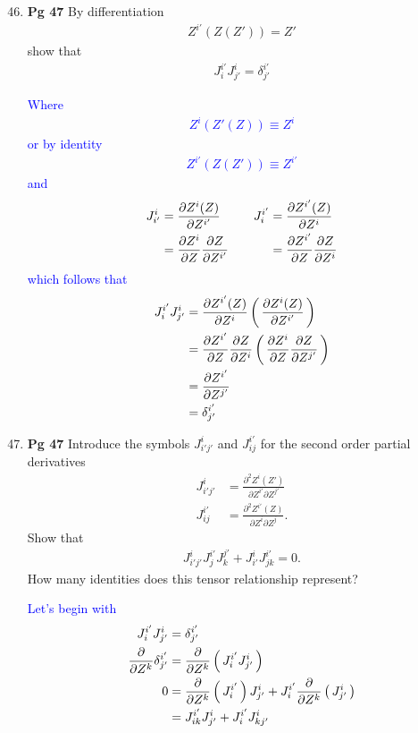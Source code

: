 \documentclass[12pt,a4paper]{report}
\newcommand{\BLUE}[1]{\textcolor{blue}{#1}}
\begin{document}
\begin{enumerate}[label=\textbf{4.\arabic*}]

\setcounter{enumi}{45}
	\item \textbf{Pg 47}  By differentiation
	\begin{align*}
		Z^{i'}(Z(Z'))=Z'
	\end{align*}show that 
	\begin{align*}
		J_i^{i'}J_{j'}^i= \delta^{i'}_{j'}
	\end{align*}
	
	\BLUE{Where
	\begin{align*}
		Z^i(Z'(Z)) \equiv Z^i
	\end{align*}or by identity
	\begin{align*}
		Z^{i'}(Z(Z')) \equiv Z^{i'}
	\end{align*}and
	\begin{align*}
		J_{i'}^i &= \frac{\partial Z^i(Z)}{\partial Z^{i'}} & \quad
		J_i^{i'} &= \frac{\partial Z^{i'}(Z)}{\partial Z^i} \\
			&= \frac{\partial Z^i}{\partial Z}\frac{\partial Z}{\partial Z^{i'}} & \quad &= \frac{\partial Z^{i'}}{\partial Z}\frac{\partial Z}{\partial Z^i}
	\end{align*}which follows that
	\begin{align*}
		J_i^{i'}J_{j'}^i &= \frac{\partial Z^{i'}(Z)}{\partial Z^i}\left (\, \frac{\partial Z^i(Z)}{\partial Z^{i'}} \,\right ) \\
		&= \frac{\partial Z^{i'}}{\partial Z}\frac{\partial Z}{\partial Z^i}\left (\, \frac{\partial Z^i}{\partial Z}\frac{\partial Z}{\partial Z^{j'}} \,\right ) \\
		&= \frac{\partial Z^{i'}}{\partial Z^{j'}} \\
		&= \delta_{j'}^{i'}
	\end{align*}
	}

\setcounter{enumi}{47}
	
	\item \textbf{Pg 47} Introduce the symbols $J_{i'j'}^i$ and $J_{ij}^{i'}$ for the second order partial derivatives
	\begin{align*}
		J_{i'j'}^i &= \frac{\partial^2 Z^i(Z')}{\partial Z^{i'}\partial Z^{j'}}\\
		J_{ij}^{i'} &= \frac{\partial^2 Z^{i'}(Z)}{\partial Z^{i}\partial Z^{j}}.
	\end{align*}Show that
	\begin{align*}
		J_{i'j'}^iJ_j^{i'}J_k^{j'}+J_{i'}^iJ_{jk}^{i'}=0.
\end{align*}	 How many identities does this tensor relationship represent?
	
	\BLUE{Let's begin with 
	\begin{align*}
		J_i^{i'}J_{j'}^i &=\delta_{j'}^{i'} \\
		\frac{\partial}{\partial Z^k}\delta_{j'}^{i'} &=\frac{\partial}{\partial Z^k}\left (\, J_i^{i'}J_{j'}^i \,\right ) \\
		0 &= \frac{\partial}{\partial Z^k}\left (\, J_i^{i'} \,\right )J_{j'}^i + J_i^{i'}\frac{\partial}{\partial Z^k}\left (\, J_{j'}^i \,\right )\\
		&= J_{ik}^{i'}J_{j'}^i+J_i^{i'}J_{kj'}^i
	\end{align*}
	}


\end{enumerate}
\end{document}
